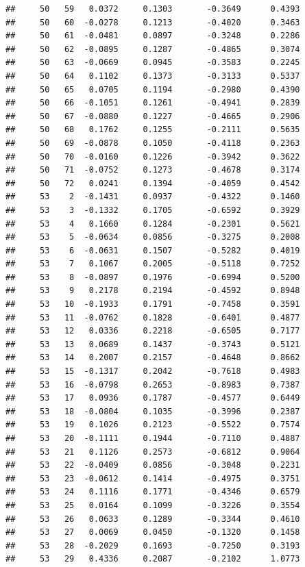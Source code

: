 \documentclass[
]{article}
\begin{document}
\begin{verbatim}
##     50   59   0.0372     0.1303       -0.3649      0.4393 
##     50   60  -0.0278     0.1213       -0.4020      0.3463 
##     50   61  -0.0481     0.0897       -0.3248      0.2286 
##     50   62  -0.0895     0.1287       -0.4865      0.3074 
##     50   63  -0.0669     0.0945       -0.3583      0.2245 
##     50   64   0.1102     0.1373       -0.3133      0.5337 
##     50   65   0.0705     0.1194       -0.2980      0.4390 
##     50   66  -0.1051     0.1261       -0.4941      0.2839 
##     50   67  -0.0880     0.1227       -0.4665      0.2906 
##     50   68   0.1762     0.1255       -0.2111      0.5635 
##     50   69  -0.0878     0.1050       -0.4118      0.2363 
##     50   70  -0.0160     0.1226       -0.3942      0.3622 
##     50   71  -0.0752     0.1273       -0.4678      0.3174 
##     50   72   0.0241     0.1394       -0.4059      0.4542 
##     53    2  -0.1431     0.0937       -0.4322      0.1460 
##     53    3  -0.1332     0.1705       -0.6592      0.3929 
##     53    4   0.1660     0.1284       -0.2301      0.5621 
##     53    5  -0.0634     0.0856       -0.3275      0.2008 
##     53    6  -0.0631     0.1507       -0.5282      0.4019 
##     53    7   0.1067     0.2005       -0.5118      0.7252 
##     53    8  -0.0897     0.1976       -0.6994      0.5200 
##     53    9   0.2178     0.2194       -0.4592      0.8948 
##     53   10  -0.1933     0.1791       -0.7458      0.3591 
##     53   11  -0.0762     0.1828       -0.6401      0.4877 
##     53   12   0.0336     0.2218       -0.6505      0.7177 
##     53   13   0.0689     0.1437       -0.3743      0.5121 
##     53   14   0.2007     0.2157       -0.4648      0.8662 
##     53   15  -0.1317     0.2042       -0.7618      0.4983 
##     53   16  -0.0798     0.2653       -0.8983      0.7387 
##     53   17   0.0936     0.1787       -0.4577      0.6449 
##     53   18  -0.0804     0.1035       -0.3996      0.2387 
##     53   19   0.1026     0.2123       -0.5522      0.7574 
##     53   20  -0.1111     0.1944       -0.7110      0.4887 
##     53   21   0.1126     0.2573       -0.6812      0.9064 
##     53   22  -0.0409     0.0856       -0.3048      0.2231 
##     53   23  -0.0612     0.1414       -0.4975      0.3751 
##     53   24   0.1116     0.1771       -0.4346      0.6579 
##     53   25   0.0164     0.1099       -0.3226      0.3554 
##     53   26   0.0633     0.1289       -0.3344      0.4610 
##     53   27   0.0069     0.0450       -0.1320      0.1458 
##     53   28  -0.2029     0.1693       -0.7250      0.3193 
##     53   29   0.4336     0.2087       -0.2102      1.0773 

\end{verbatim}
\end{document}
